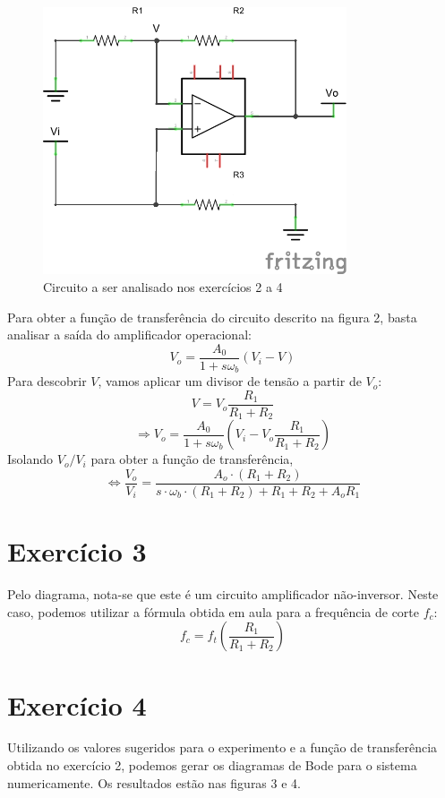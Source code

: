 \documentclass[12pt, a4paper, twoside]{article}
\begin{document}
\begin{figure}
    \centering
    \includegraphics[width=0.8\textwidth]{figs/rel2/ex2.png}
    \caption{Circuito a ser analisado nos exercícios 2 a 4}
\end{figure}

Para obter a função de transferência do circuito descrito na figura 2, basta analisar a saída do amplificador operacional:
$$ V_o = \frac{A_0}{1+s \omega_b}(V_i-V) $$
Para descobrir $V$, vamos aplicar um divisor de tensão a partir de $V_o$:
$$ V = V_o \frac{R_1}{R_1 + R_2} $$
$$ \Rightarrow V_o = \frac{A_0}{1+s \omega_b} \left(V_i - V_o \frac{R_1}{R_1 + R_2} \right) $$
Isolando $V_o/V_i$ para obter a função de transferência,
$$ \Leftrightarrow \frac{V_o}{V_i} = \frac{A_o\cdotp(R_1 + R_2)}{s\cdotp\omega_b\cdotp(R_1+R_2)+R_1+R_2+A_oR_1} $$

\section{Exercício 3}

Pelo diagrama, nota-se que este é um circuito amplificador não-inversor. Neste caso, podemos utilizar a fórmula obtida em aula para a frequência de corte $f_c$:
$$ f_c = f_t \left( \frac{R_1}{R_1 + R_2} \right) $$

\section{Exercício 4}

Utilizando os valores sugeridos para o experimento e a função de transferência obtida no exercício 2, podemos gerar os diagramas de Bode para o sistema numericamente. Os resultados estão nas figuras 3 e 4.
\end{document}
